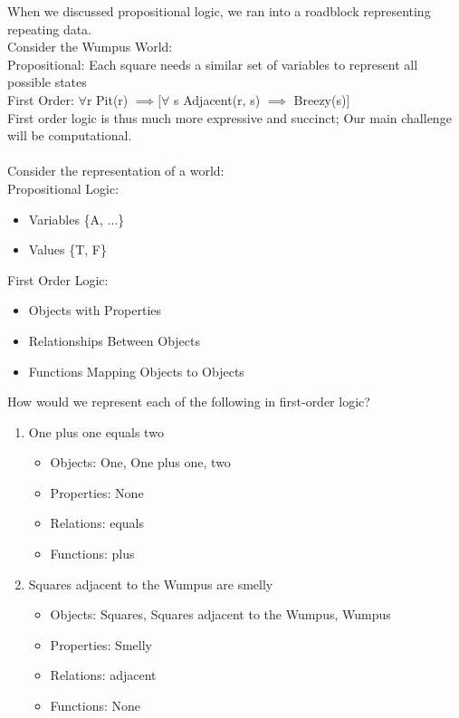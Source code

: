 \documentclass[../../lecture_notes.tex]{subfiles}
\begin{document}
\noindent When we discussed propositional logic, we ran into a roadblock representing repeating data.\\
Consider the Wumpus World:\\
\indent Propositional: Each square needs a similar set of variables to represent all possible states\\
\indent First Order: $\forall $r Pit(r) $\implies [\forall$ s Adjacent(r, s) $\implies$ Breezy(s)]\\
First order logic is thus much more expressive and succinct; Our main challenge will be computational.\\
\\
Consider the representation of a world:\\
	\indent Propositional Logic:
		\begin{itemize} [itemsep=0mm]
			\item Variables \{A, ...\} 
			\item Values \{T, F\}
		\end{itemize}
	\indent First Order Logic: 
		\begin{itemize} [itemsep=0mm]
			\item Objects with Properties
			\item Relationships Between Objects
			\item Functions Mapping Objects to Objects
		\end{itemize} \medskip

\noindent How would we represent each of the following in first-order logic?
\begin{enumerate} [itemsep=0mm]
	\item One plus one equals two
		\begin{itemize} [itemsep=0mm]
			\item Objects: One, One plus one, two
			\item Properties: None
			\item Relations: equals
			\item Functions: plus
		\end{itemize}
	\item Squares adjacent to the Wumpus are smelly
		\begin{itemize} [itemsep=0mm]
			\item Objects: Squares, Squares adjacent to the Wumpus, Wumpus
			\item Properties: Smelly
			\item Relations: adjacent
			\item Functions: None
		\end{itemize}
\end{enumerate}
\end{document}
